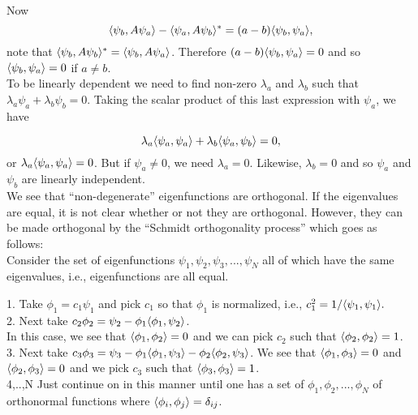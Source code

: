 Now
\[ \langle \psi_b, A \psi_a\rangle - \langle \psi_a, A\psi_b\rangle^* = (a - b)\langle \psi_b,\psi_a\rangle,\]
note that $\langle \psi_b,A\psi_b\rangle^* = \langle \psi_b,A\psi_a\rangle$. Therefore
$(a-b)\langle \psi_b,\psi_a\rangle = 0$ and so $\langle \psi_b,\psi_a\rangle = 0$ if $a\ne b$. \\

To be linearly dependent we need to find non-zero $\lambda_a$ and $\lambda_b$ such that $\lambda_a \psi_a + \lambda_b \psi_b = 0$. 
Taking the scalar product of this last expression with $\psi_a$, we have 

\[ \lambda_a \langle \psi_a,\psi_a\rangle + \lambda_b \langle \psi_a,\psi_b\rangle = 0,\] or $\lambda_a \langle \psi_a,\psi_a\rangle = 0$. But if $\psi_a\ne 0$, we need
$\lambda_a = 0$. Likewise, $\lambda_b = 0$ and so $\psi_a$ and $\psi_b$ are linearly independent. \\

We see that ``non-degenerate'' eigenfunctions are orthogonal. If the eigenvalues are equal, it is not clear whether or not they are orthogonal. However,
they can be made orthogonal by the 	``Schmidt orthogonality process'' which goes as follows:\\

Consider the set of eigenfunctions $\psi_1, \psi_2, \psi_3,..., \psi_N$ all of which have the same eigenvalues, i.e., eigenfunctions are all equal.

1. Take $\phi_1 = c_1 \psi_1$  and pick $c_1$ so that $\phi_1$ is normalized, i.e., $c_1^2 = 1/\langle \psi_1,\psi_1\rangle.$\\
2. Next take $c_2 \phi_2 = \psi_2 - \phi_1\langle \phi_1,\psi_2\rangle$.\\
In this case, we see that $\langle \phi_1,\phi_2\rangle = 0$ and we can pick $c_2$ such that $\langle \phi_2,\phi_2\rangle = 1$.\\
3. Next take $c_3 \phi_3 = \psi_3 - \phi_1\langle \phi_1,\psi_3\rangle - \phi_2\langle \phi_2,\psi_3\rangle$. We see that $\langle \phi_1,\phi_3\rangle = 0$ and $\langle \phi_2,\phi_3\rangle = 0$
and we pick $c_3$ such that $\langle \phi_3,\phi_3\rangle = 1$.\\
4,..,N Just continue on in this manner until one has a set of $\phi_1, \phi_2,..., \phi_N$ of orthonormal functions where $\langle \phi_i, \phi_j\rangle = \delta_{ij}$.   
   
